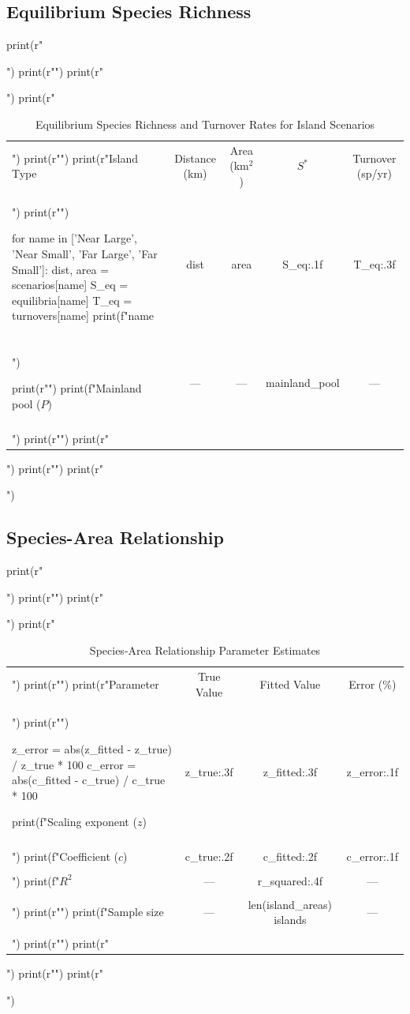 \documentclass[a4paper, 11pt]{article}
\begin{document}
\subsection{Equilibrium Species Richness}

\begin{pycode}
print(r"\begin{table}[htbp]")
print(r"\centering")
print(r"\caption{Equilibrium Species Richness and Turnover Rates for Island Scenarios}")
print(r"\begin{tabular}{lcccc}")
print(r"\toprule")
print(r"Island Type & Distance (km) & Area (km$^2$) & $S^*$ & Turnover (sp/yr) \\")
print(r"\midrule")

for name in ['Near Large', 'Near Small', 'Far Large', 'Far Small']:
    dist, area = scenarios[name]
    S_eq = equilibria[name]
    T_eq = turnovers[name]
    print(f"{name} & {dist} & {area} & {S_eq:.1f} & {T_eq:.3f} \\\\")

print(r"\midrule")
print(f"Mainland pool ($P$) & --- & --- & {mainland_pool} & --- \\\\")
print(r"\bottomrule")
print(r"\end{tabular}")
print(r"\label{tab:equilibrium}")
print(r"\end{table}")
\end{pycode}

\subsection{Species-Area Relationship}

\begin{pycode}
print(r"\begin{table}[htbp]")
print(r"\centering")
print(r"\caption{Species-Area Relationship Parameter Estimates}")
print(r"\begin{tabular}{lccc}")
print(r"\toprule")
print(r"Parameter & True Value & Fitted Value & Error (\%) \\")
print(r"\midrule")

z_error = abs(z_fitted - z_true) / z_true * 100
c_error = abs(c_fitted - c_true) / c_true * 100

print(f"Scaling exponent ($z$) & {z_true:.3f} & {z_fitted:.3f} & {z_error:.1f} \\\\")
print(f"Coefficient ($c$) & {c_true:.2f} & {c_fitted:.2f} & {c_error:.1f} \\\\")
print(f"$R^2$ & --- & {r_squared:.4f} & --- \\\\")
print(r"\midrule")
print(f"Sample size & --- & {len(island_areas)} islands & --- \\\\")
print(r"\bottomrule")
print(r"\end{tabular}")
print(r"\label{tab:species_area}")
print(r"\end{table}")
\end{pycode}
\end{document}
